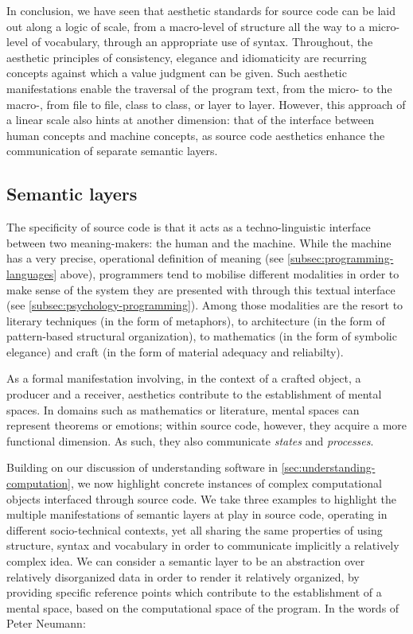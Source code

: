 In conclusion, we have seen that aesthetic standards for source code can be laid out along a logic of scale, from a macro-level of structure all the way to a micro-level of vocabulary, through an appropriate use of syntax. Throughout, the aesthetic principles of consistency, elegance and idiomaticity are recurring concepts against which a value judgment can be given. Such aesthetic manifestations enable the traversal of the program text, from the micro- to the macro-, from file to file, class to class, or layer to layer. However, this approach of a linear scale also hints at another dimension: that of the interface between human concepts and machine concepts, as source code aesthetics enhance the communication of separate semantic layers.

\subsection{Semantic layers}
\label{subsec:semantic-layers}

The specificity of source code is that it acts as a techno-linguistic interface between two meaning-makers: the human and the machine. While the machine has a very precise, operational definition of meaning (see \autoref{subsec:programming-languages} above), programmers tend to mobilise different modalities in order to make sense of the system they are presented with through this textual interface (see \autoref{subsec:psychology-programming}). Among those modalities are the resort to literary techniques (in the form of metaphors), to architecture (in the form of pattern-based structural organization), to mathematics (in the form of symbolic elegance) and craft (in the form of material adequacy and reliabilty).

As a formal manifestation involving, in the context of a crafted object, a producer and a receiver, aesthetics contribute to the establishment of mental spaces. In domains such as mathematics or literature, mental spaces can represent theorems or emotions; within source code, however, they acquire a more functional dimension. As such, they also communicate \emph{states} and \emph{processes}.

Building on our discussion of understanding software in \autoref{sec:understanding-computation}, we now highlight concrete instances of complex computational objects interfaced through source code. We take three examples to highlight the multiple manifestations of semantic layers at play in source code, operating in different socio-technical contexts, yet all sharing the same properties of using structure, syntax and vocabulary in order to communicate implicitly a relatively complex idea. We can consider a semantic layer to be an abstraction over relatively disorganized data in order to render it relatively organized, by providing specific reference points which contribute to the establishment of a mental space, based on the computational space of the program. In the words of Peter Neumann:

